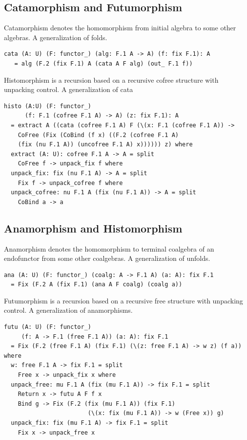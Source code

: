 \documentclass{article}
\begin{document}
\subsection{Catamorphism and Futumorphism}

Catamorphism denotes the homomorphism from initial algebra to some other algebras.
A generalization of folds.

\begin{lstlisting}[mathescape=true]
cata (A: U) (F: functor_) (alg: F.1 A -> A) (f: fix F.1): A
   = alg (F.2 (fix F.1) A (cata A F alg) (out_ F.1 f))
\end{lstlisting}

Histomorphism is a recursion based on a recursive cofree structure with unpacking control.
A generalization of cata

\begin{lstlisting}[mathescape=true]
histo (A:U) (F: functor_)
      (f: F.1 (cofree F.1 A) -> A) (z: fix F.1): A
  = extract A ((cata (cofree F.1 A) F (\(x: F.1 (cofree F.1 A)) ->
    CoFree (Fix (CoBind (f x) ((F.2 (cofree F.1 A)
    (fix (nu F.1 A)) (uncofree F.1 A) x)))))) z) where
  extract (A: U): cofree F.1 A -> A = split
    CoFree f -> unpack_fix f where
  unpack_fix: fix (nu F.1 A) -> A = split
    Fix f -> unpack_cofree f where
  unpack_cofree: nu F.1 A (fix (nu F.1 A)) -> A = split
    CoBind a -> a
\end{lstlisting}

\subsection{Anamorphism and Histomorphism}

Anamorphism denotes the homomorphism to terminal coalgebra of an endofunctor
from some other coalgebras. A generalization of unfolds.

\begin{lstlisting}[mathescape=true]
ana (A: U) (F: functor_) (coalg: A -> F.1 A) (a: A): fix F.1
  = Fix (F.2 A (fix F.1) (ana A F coalg) (coalg a))
\end{lstlisting}

Futumorphism is a recursion based on a recursive free structure with unpacking control.
A generalization of anamorphisms.

\begin{lstlisting}[mathescape=true]
futu (A: U) (F: functor_)
     (f: A -> F.1 (free F.1 A)) (a: A): fix F.1
  = Fix (F.2 (free F.1 A) (fix F.1) (\(z: free F.1 A) -> w z) (f a)) where
  w: free F.1 A -> fix F.1 = split
    Free x -> unpack_fix x where
  unpack_free: mu F.1 A (fix (mu F.1 A)) -> fix F.1 = split
    Return x -> futu A F f x
    Bind g -> Fix (F.2 (fix (mu F.1 A)) (fix F.1)
                        (\(x: fix (mu F.1 A)) -> w (Free x)) g)
  unpack_fix: fix (mu F.1 A) -> fix F.1 = split
    Fix x -> unpack_free x
\end{lstlisting}
\end{document}
